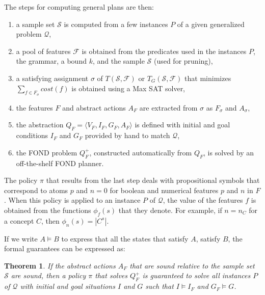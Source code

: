 \documentclass[letterpaper]{article} %
\newcommand{\tup}[1]{\langle #1 \rangle}
\newtheorem{theorem}[definition]{Theorem}
\newcommand{\Q}{\mathcal{Q}}
\newcommand{\F}{\mathcal{F}}
\renewcommand{\S}{\mathcal{S}}
\begin{document}
The steps for computing general plans are then:
\begin{enumerate}[1.]
  \item a sample set $\S$ is computed from a few instances $P$ of a given
    generalized problem $\Q$,
  \item a pool of features $\F$ is obtained from the predicates used in the
    instances $P$, the grammar, a  bound $k$, and the sample $\S$ (used for
    pruning),
  \item a satisfying assignment $\sigma$ of $T(\S,\F)$ or $T_G(\S,\F)$
    that minimizes $\sum_{f \in F_{\sigma}} cost(f)$ is obtained using a
    Max SAT solver,
  \item the features $F$ and abstract actions $A_F$ are extracted from $\sigma$
    as $F_{\sigma}$ and $A_{\sigma}$,
  \item the abstraction $Q_F=\tup{V_F,I_F,G_F,A_F}$ is defined with initial and goal
    conditions $I_F$ and $G_F$ provided by hand to match $\Q$, 
  \item the FOND problem $Q^+_F$, constructed automatically from $Q_F$, is solved by an off-the-shelf
    FOND planner.
\end{enumerate}

The policy $\pi$ that results from the last step deals with propositional symbols that correspond to atoms $p$ and $n=0$ for boolean
and numerical features $p$ and $n$ in $F$. When this policy is applied to an instance $P$ of $\Q$, the  value of the features $f$
is obtained from the functions $\phi_f(s)$ that they denote. For example, if $n=n_C$ for a concept $C$, then $\phi_{n}(s)=|C^s|$.

If we write $A \vDash B$ to express that all the states that satisfy $A$, satisfy $B$, 
the formal guarantees can be expressed as:

\begin{theorem}
If the abstract actions $A_F$ that are sound relative to the sample set $\S$  are  sound,
then a   policy $\pi$ that solves  $Q^+_F$  is guaranteed to solve  all instances $P$ of $\Q$
with initial and goal situations $I$ and $G$ such that $I \vDash  I_F$ and $G_F \vDash G$.
\end{theorem}

\end{document}

